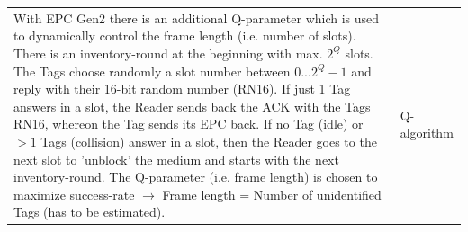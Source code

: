 	\begin{tabular}{ll}
		\parbox{10cm}{
			With EPC Gen2 there is an additional Q-parameter which is used to dynamically control the frame length (i.e. number of slots). 
			There is an inventory-round at the beginning with max. $2^Q$ slots. The Tags choose randomly a slot number between $0 ... 2^Q-1$ and 
			reply with their 16-bit random number (RN16). If just 1 Tag answers in a slot, the Reader sends back the ACK with the Tags RN16, 
			whereon the Tag sends its EPC back. If no Tag (idle) or $>1$ Tags (collision) answer in a slot, then the Reader goes to the next 
			slot to 'unblock' the medium and starts with the next inventory-round.
			The Q-parameter (i.e. frame length) is chosen to maximize success-rate $\rightarrow$ Frame length = Number of unidentified Tags (has to be estimated).
		}	
		& \parbox{8cm}{
			\\ Q-algorithm
		}
	\end{tabular}

